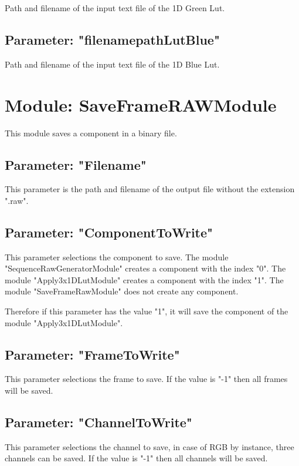 Path and filename of the input text file of the 1D Green Lut.

\subsection{Parameter: "filenamepathLutBlue"}

Path and filename of the input text file of the 1D Blue Lut.

\section{Module: SaveFrameRAWModule}

This module saves a component in a binary file.

\subsection{Parameter: "Filename"}

This parameter is the path and filename of the output file without the extension ".raw".

\subsection{Parameter: "ComponentToWrite"}

This parameter selections the component to save. The module "SequenceRawGeneratorModule" creates a component with the index "0". The module "Apply3x1DLutModule" creates a component with the index "1". The module "SaveFrameRawModule" does not create any component.

Therefore if this parameter has the value "1", it will save the component of the module "Apply3x1DLutModule".

\subsection{Parameter: "FrameToWrite"}
This parameter selections the frame to save. If the value is "-1" then all frames will be saved.

\subsection{Parameter: "ChannelToWrite"}

This parameter selections the channel to save, in case of RGB by instance, three channels can be saved. If the value is "-1" then all channels will be saved.

